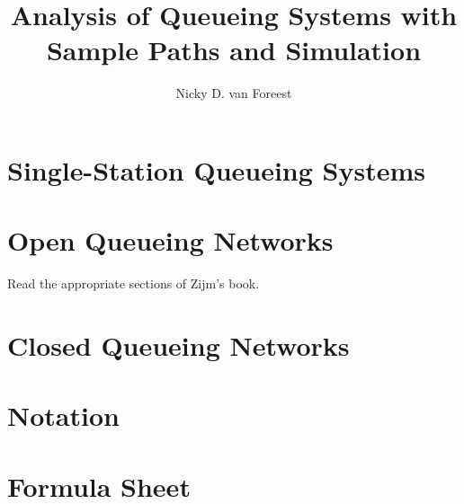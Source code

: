 \documentclass[a4paper,11pt]{scrbook}
\author{Nicky D. van  Foreest}
\title{Analysis of Queueing Systems with  Sample Paths and Simulation }
\begin{document}
\maketitle
\tableofcontents



\chapter{Single-Station Queueing Systems}
\label{cha:single-stat-queu}



















% 
%
 

 


\chapter{Open Queueing Networks}
\label{sec:notes-relat-chapt2}

Read the appropriate sections of Zijm's book. 








\chapter{Closed Queueing Networks}
\label{ch3}








\chapter{Notation}
\label{sec:notation}


\chapter{Formula Sheet}

   



\end{document}
